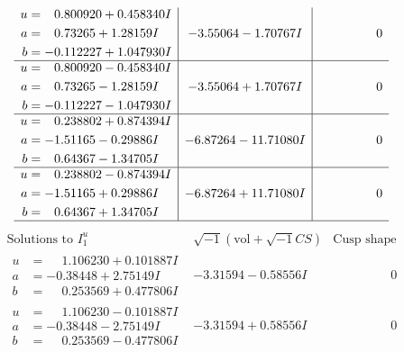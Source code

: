 \documentclass[1p]{elsarticle_modified}
\theoremstyle{definition}
\newcommand{\I}{\sqrt{-1}}
\begin{document}
$$\begin{array}{c|c|c}
\begin{aligned}
u &= \phantom{-}0.800920 + 0.458340 I \\
a &= \phantom{-}0.73265 + 1.28159 I \\
b &= -0.112227 + 1.047930 I\end{aligned}
 & -3.55064 - 1.70767 I & \phantom{-0.000000 } 0 \\ \hline\begin{aligned}
u &= \phantom{-}0.800920 - 0.458340 I \\
a &= \phantom{-}0.73265 - 1.28159 I \\
b &= -0.112227 - 1.047930 I\end{aligned}
 & -3.55064 + 1.70767 I & \phantom{-0.000000 } 0 \\ \hline\begin{aligned}
u &= \phantom{-}0.238802 + 0.874394 I \\
a &= -1.51165 - 0.29886 I \\
b &= \phantom{-}0.64367 - 1.34705 I\end{aligned}
 & -6.87264 - 11.71080 I & \phantom{-0.000000 } 0 \\ \hline\begin{aligned}
u &= \phantom{-}0.238802 - 0.874394 I \\
a &= -1.51165 + 0.29886 I \\
b &= \phantom{-}0.64367 + 1.34705 I\end{aligned}
 & -6.87264 + 11.71080 I & \phantom{-0.000000 } 0\\
 \hline 
 \end{array}$$\newpage$$\begin{array}{c|c|c}  
\text{Solutions to }I^u_{1}& \I (\text{vol} + \sqrt{-1}CS) & \text{Cusp shape}\\
 \hline 
\begin{aligned}
u &= \phantom{-}1.106230 + 0.101887 I \\
a &= -0.38448 + 2.75149 I \\
b &= \phantom{-}0.253569 + 0.477806 I\end{aligned}
 & -3.31594 - 0.58556 I & \phantom{-0.000000 } 0 \\ \hline\begin{aligned}
u &= \phantom{-}1.106230 - 0.101887 I \\
a &= -0.38448 - 2.75149 I \\
b &= \phantom{-}0.253569 - 0.477806 I\end{aligned}
 & -3.31594 + 0.58556 I & \phantom{-0.000000 } 0 \\ \hline\begin{aligned}

\end{aligned}
\end{array}$$
\end{document}
